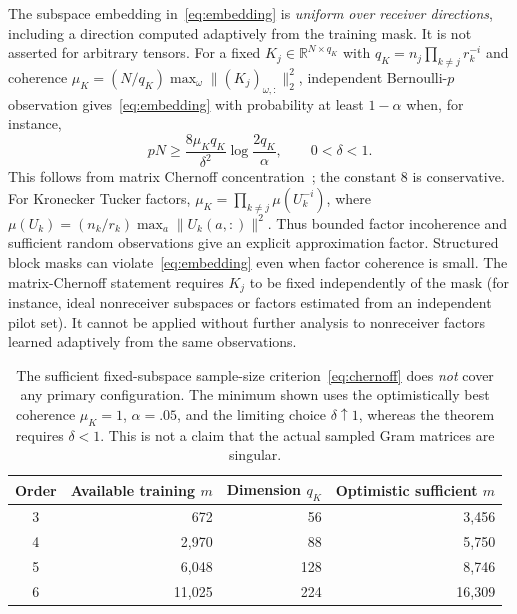 \documentclass[review,10pt]{elsarticle}
\newcommand{\R}{\mathbb R}
\begin{document}
The subspace embedding in~\eqref{eq:embedding} is \emph{uniform over receiver directions}, including a direction computed adaptively from the training mask. It is not asserted for arbitrary tensors. For a fixed $K_j\in\R^{N\times q_K}$ with $q_K=n_j\prod_{k\ne j}r_k^{-i}$ and coherence $\mu_K=(N/q_K)\max_\omega\|(K_j)_{\omega,:}\|_2^2$, independent Bernoulli-$p$ observation gives~\eqref{eq:embedding} with probability at least $1-\alpha$ when, for instance,
\begin{equation}\label{eq:chernoff}
pN\ge\frac{8\mu_Kq_K}{\delta^2}\log\frac{2q_K}{\alpha},\qquad0<\delta<1.
\end{equation}
This follows from matrix Chernoff concentration~\cite{Tropp2012}; the constant 8 is conservative. For Kronecker Tucker factors, $\mu_K=\prod_{k\ne j}\mu(U_k^{-i})$, where $\mu(U_k)=(n_k/r_k)\max_a\|U_k(a,:)\|^2$. Thus bounded factor incoherence and sufficient random observations give an explicit approximation factor. Structured block masks can violate~\eqref{eq:embedding} even when factor coherence is small. The matrix-Chernoff statement requires $K_j$ to be fixed independently of the mask (for instance, ideal nonreceiver subspaces or factors estimated from an independent pilot set). It cannot be applied without further analysis to nonreceiver factors learned adaptively from the same observations.

\begin{table}[tbp]
\caption{The sufficient fixed-subspace sample-size criterion~\eqref{eq:chernoff} does \emph{not} cover any primary configuration. The minimum shown uses the optimistically best coherence $\mu_K=1$, $\alpha=.05$, and the limiting choice $\delta\uparrow1$, whereas the theorem requires $\delta<1$. This is not a claim that the actual sampled Gram matrices are singular.}\label{tab:samplegap}
\centering\small
\begin{tabular}{crrr}
\toprule
Order & Available training $m$ & Dimension $q_K$ & Optimistic sufficient $m$\\
\midrule
3 & 672 & 56 & 3,456\\
4 & 2,970 & 88 & 5,750\\
5 & 6,048 & 128 & 8,746\\
6 & 11,025 & 224 & 16,309\\
\bottomrule
\end{tabular}
\end{table}
\end{document}
